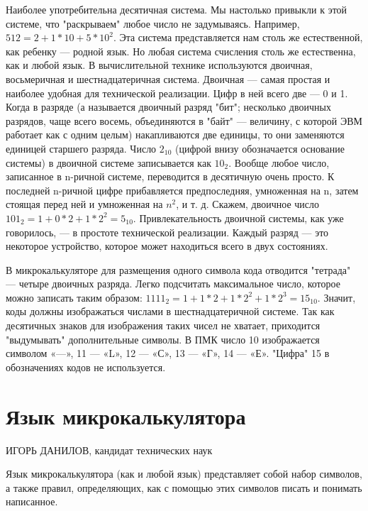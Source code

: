 \documentclass[11pt,a4paper,oneside]{article}
\begin{document}
Наиболее употребительна десятичная система. Мы настолько привыкли к этой системе, что "раскрываем" любое число не задумываясь. Например, $512 = 2 + 1 * 10 + 5*10^{2}$. Эта система представляется нам столь же естественной, как ребенку — родной язык. Но любая система счисления столь же естественна, как и любой язык. В вычислительной технике используются двоичная, восьмеричная и шестнадцатеричная система. Двоичная — самая простая и наиболее удобная для технической реализации. Цифр в ней всего две — 0 и 1. Когда в разряде (а называется двоичный разряд "бит"; несколько двоичных разрядов, чаще всего восемь, объединяются в "байт" — величину, с которой ЭВМ работает как с одним целым) накапливаются две единицы, то они заменяются единицей старшего разряда. Число $2_{10}$ (цифрой внизу обозначается основание системы) в двоичной системе записывается как $10_{2}$. Вообще любое число, записанное в n-ричной системе, переводится в десятичную очень просто. К последней n-ричной цифре прибавляется предпоследняя, умноженная на n, затем стоящая перед ней и умноженная на $n^{2}$, и т. д. Скажем, двоичное число $101_{2} = 1+0*2 + 1*2^{2} = 5_{10}$. Привлекательность двоичной системы, как уже говорилось, — в простоте технической реализации. Каждый разряд — это некоторое устройство, которое может находиться всего в двух состояниях.

В микрокалькуляторе для размещения одного символа кода отводится "тетрада" — четыре двоичных разряда. Легко подсчитать максимальное число, которое можно записать таким образом: $1111_{2} = 1 + 1 * 2 + 1 * 2^{2} + 1 * 2^{3} = 15_{10}$. Значит, коды должны изображаться числами в шестнадцатеричной системе. Так как десятичных знаков для изображения таких чисел не хватает, приходится "выдумывать" дополнительные символы. В ПМК число 10 изображается символом «—», 11 — «L», 12 — «С», 13 — «Г», 14 — «Е». "Цифра" 15 в обозначениях кодов не используется.

\section{Язык микрокалькулятора}
ИГОРЬ ДАНИЛОВ,
кандидат технических наук

Язык микрокалькулятора (как и любой язык) представляет собой набор символов, а также правил, определяющих, как с помощью этих символов писать и понимать написанное.
\end{document}
